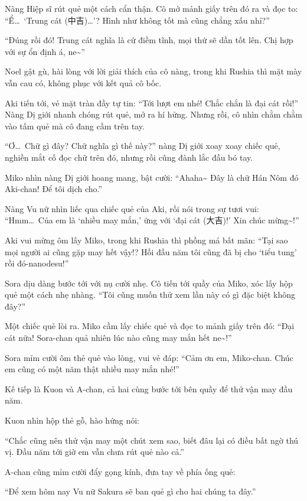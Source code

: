 \documentclass[../main.tex]{subfiles}
\begin{document}
Nàng Hiệp sĩ rút quẻ một cách cẩn thận. Cô mở mảnh giấy trên đó ra và đọc to: ``Ể\dots\ `Trung cát (中吉)\dots'? Hình như không tốt mà cũng chẳng xấu nhỉ?''

``Đúng rồi đó! Trung cát nghĩa là cứ điềm tĩnh, mọi thứ sẽ dần tốt lên. Chị hợp với sự ổn định á, ne\~{}''

Noel gật gù, hài lòng với lời giải thích của cô nàng, trong khi Rushia thì mặt mày vẫn cau có, không phục với kết quả cô bốc.

Aki tiến tới, vẻ mặt tràn đầy tự tin: ``Tới lượt em nhé! Chắc chắn là đại cát rồi!'' Nàng Dị giới nhanh chóng rút quẻ, mở ra hí hửng. Nhưng rồi, cô nhìn chằm chằm vào tấm quẻ mà cô đang cầm trên tay.

``Ơ\dots\ Chữ gì đây? Chữ nghĩa gì thế này?'' nàng Dị giới xoay xoay chiếc quẻ, nghiền mắt cố đọc chữ trên đó, nhưng rồi cũng đành lắc đầu bó tay.

Miko nhìn nàng Dị giới hoang mang, bật cười: ``Ahaha\~{} Đây là chữ Hán Nôm đó Aki-chan! Để tôi dịch cho.''

Nàng Vu nữ nhìn liếc qua chiếc quẻ của Aki, rồi nói trong sự tươi vui: ``Hmm\dots\ Của em là `nhiều may mắn,' ứng với `đại cát (大吉)!' Xin chúc mừng\~{}!''

Aki vui mừng ôm lấy Miko, trong khi Rushia thì phồng má bất mãn: ``Tại sao mọi người ai cũng gặp may hết vậy!? Hồi đầu năm tôi cũng đã bị cho `tiểu tung' rồi đó-nanodesu!''

Sora dịu dàng bước tới với nụ cười nhẹ. Cô tiến tới quầy của Miko, xóc lấy hộp quẻ một cách nhẹ nhàng. ``Tôi cũng muốn thử xem lần này có gì đặc biệt không đây?''

Một chiếc quẻ lòi ra. Miko cầm lấy chiếc quẻ và đọc to mảnh giấy trên đó: ``Đại cát nữa! Sora-chan quả nhiên lúc nào cũng may mắn hết ne\~{}!''

Sora mỉm cười ôm thẻ quẻ vào lòng, vui vẻ đáp: ``Cảm ơn em, Miko-chan. Chúc em cũng có một năm thật nhiều may mắn nhé!''

Kế tiếp là Kuon và A-chan, cả hai cùng bước tới bên quầy để thử vận may đầu năm.

Kuon nhìn hộp thẻ gỗ, hào hứng nói:

``Chắc cũng nên thử vận may một chút xem sao, biết đâu lại có điều bất ngờ thú vị. Đầu năm tới giờ em vẫn chưa rút quẻ nào cả.''

A-chan cũng mỉm cười đẩy gọng kính, đưa tay về phía ống quẻ:

``Để xem hôm nay Vu nữ Sakura sẽ ban quẻ gì cho hai chúng ta đây.''
\end{document}
